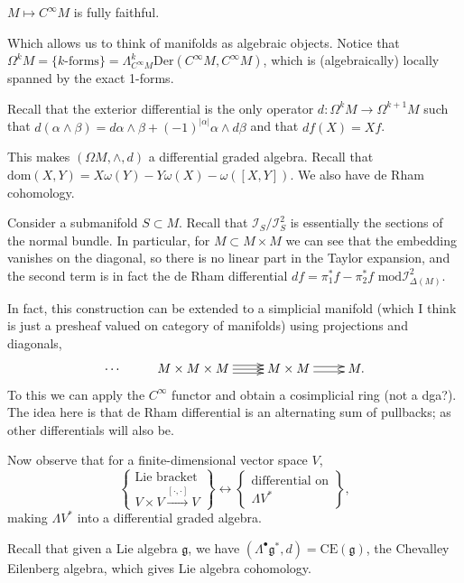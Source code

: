 \begin{remark}
\label{remark-smoot-funct-ring-fully-faith}
$M \mapsto C^\infty M$ is fully faithful.
\end{remark}

\noindent
Which allows us to think of manifolds as
algebraic objects.
Notice that
$\Omega^kM=\{k\text{-forms}\}
=\Lambda^k_{C^\infty M}\text{Der}(C^\infty
M,C^\infty M)$,
which is (algebraically) locally spanned
by the exact 1-forms.

Recall that the exterior differential is
the only operator $d:\Omega^kM \to
\Omega^{k+1}M$
such that $d(\alpha \wedge \beta)=d\alpha
\wedge \beta +
(-1)^{|\alpha|}\alpha \wedge d\beta$
and that $df(X)=Xf$.

This makes $(\Omega M,\wedge,d)$ a
differential graded algebra.
Recall that $\text{dom}(X,Y)=X\omega(Y)-Y
\omega(X)-\omega([X,Y])$.
We also have de Rham cohomology.

Consider a submanifold $S \subset M$. Recall
that $\mathcal{I}_S/\mathcal{I}^2_S$ is
essentially
the sections of the normal bundle.
In particular, for $M \subset M \times M$
we can see that the embedding vanishes on the
diagonal,
so there is no linear part in the Taylor
expansion,
and the second term is in fact the de Rham
differential
$df=\pi_1^*f-\pi_2^*f \text{ mod
}\mathcal{I}^2_{\Delta(M)}$.

In fact, this construction can be extended to
a simplicial manifold
(which I think is just a presheaf valued on
category of manifolds)
using projections and diagonals,
$$
\xymatrix{
\cdots & M\times M \times M
\ar @< 3pt> [r]
\ar @< 0pt> [r]
\ar @<-3pt> [r] & M \times M \ar @< 2pt> [r]
\ar @<-2pt> [r]& M.
}
$$
To this we can apply the $C^\infty$ functor
and obtain
a cosimplicial ring (not a dga?).
The idea here
is that de Rham differential is an
alternating sum of pullbacks;
as other differentials will also be.

\medskip\noindent
Now observe that for a finite-dimensional
vector space $V$,
$$
\left\{\substack{\text{Lie bracket} \\
V \times V
\xrightarrow{[\cdot,\cdot]}V}\right\}
\leftrightarrow
\left\{\substack{\text{differential on} \\
\Lambda V^*}\right\},
$$
making $\Lambda V^*$ into a differential
graded algebra.

Recall that given a Lie algebra
$\mathfrak{g}$,
we have $(\Lambda^\bullet \mathfrak{g}^*
,d)=\text{CE}(\mathfrak{g})$,
the Chevalley Eilenberg algebra,
which gives Lie algebra cohomology.


